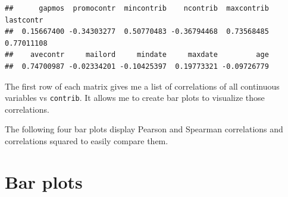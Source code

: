 \documentclass[
]{article}
\begin{document}
\begin{verbatim}
##      gapmos  promocontr  mincontrib    ncontrib  maxcontrib   lastcontr 
##  0.15667400 -0.34303277  0.50770483 -0.36794468  0.73568485  0.77011108 
##    avecontr     mailord     mindate     maxdate         age 
##  0.74700987 -0.02334201 -0.10425397  0.19773321 -0.09726779
\end{verbatim}

The first row of each matrix gives me a list of correlations of all
continuous variables vs \texttt{contrib}. It allows me to create bar
plots to visualize those correlations.

The following four bar plots display Pearson and Spearman correlations
and correlations squared to easily compare them.

\hypertarget{bar-plots}{%
\section{Bar plots}\label{bar-plots}}
\end{document}
